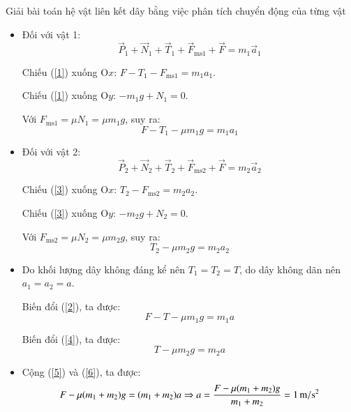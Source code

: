 \begin{dang}{Giải bài toán hệ vật liên kết dây bằng việc phân tích chuyển động của từng vật}
{{	\begin{itemize}
		\item Đối với vật 1:
		\begin{equation}\label{1}
			\vec P_1 + \vec N_1 + \vec T_1 + \vec F_\text{ms1} + \vec F = m_1 \vec a_1
		\end{equation}
		
		Chiếu (\ref{1}) xuống O$x$: $F - T_1 - F_\text{ms1} = m_1 a_1$.
		
		Chiếu (\ref{1}) xuống O$y$: $-m_1 g + N_1 = 0$.
		
		Với $F_\text{ms1} = \mu N_1 = \mu m_1 g$, suy ra:
		\begin{equation}\label{2}
			F-T_1 - \mu m_1 g = m_1 a_1
		\end{equation}
		\item Đối với vật 2:
		\begin{equation}\label{3}
			\vec P_2 + \vec N_2 + \vec T_2 + \vec F_\text{ms2} + \vec F = m_2 \vec a_2
		\end{equation}
		
		Chiếu (\ref{3}) xuống O$x$: $T_2 - F_\text{ms2} = m_2 a_2$.
		
		Chiếu (\ref{3}) xuống O$y$: $-m_2 g + N_2 = 0$.
		
		Với $F_\text{ms2} = \mu N_2 = \mu m_2 g$, suy ra:
		\begin{equation}\label{4}
			T_2 - \mu m_2 g = m_2 a_2
		\end{equation}
		
		\item Do khối lượng dây không đáng kể nên $T_1 = T_2 = T$, do dây không dãn nên $a_1 = a_2 = a$.
		
		Biến đổi (\ref{2}), ta được:
		\begin{equation}\label{5}
			F - T - \mu m_1 g = m_1 a
		\end{equation}
		
		Biến đổi (\ref{4}), ta được:
		\begin{equation}\label{6}
			T - \mu m_2 g= m_2 a
		\end{equation}
		
		\item Cộng (\ref{5}) và (\ref{6}), ta được:
		\begin{equation*}
			F - \mu (m_1 + m_2) g = (m_1 + m_2) a \\
			\Rightarrow a = \dfrac{F - \mu (m_1 + m_2)g}{m_1 + m_2} = \SI{1}{m/s^2}
		\end{equation*}
	\end{itemize}
}}



\end{dang}
